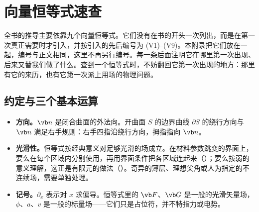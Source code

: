 \providecommand{\idwhere}[2]{\par\vspace{1pt}{\small{\sffamily\bfseries\color{muted}\ZE{首次出现}{First used}}\enspace #1\par
  {\sffamily\bfseries\color{muted}\ZE{后面用在}{Used again}}\enspace #2\par}\vspace{2pt}}

\chapter{向量恒等式速查}\label{app:identities}

全书的推导主要依靠九个向量恒等式。它们没有在书的开头一次列出，而是在第一次真正需要时才引入，并按引入的先后编号为 (V1)--(V9)。本附录把它们放在一起，编号与正文相同，这里不再另行编号。每一条后面注明它在哪里第一次出现、后来又替我们做了什么。查到一个恒等式时，不妨翻回它第一次出现的地方：那里有它的来历，也有它第一次派上用场的物理问题。

\section{约定与三个基本运算}\label{sec:app-conventions}

\begin{itemize}
\item \textbf{方向。}$\vb n$ 是闭合曲面的外法向。开曲面 $S$ 的边界曲线 $\partial S$ 的绕行方向与 $\vb n$ 满足右手规则：右手四指沿绕行方向，拇指指向 $\vb n$。
\item \textbf{光滑性。}恒等式按经典意义对足够光滑的场成立。在材料参数跳变的界面上，要么在每个区域内分别使用，再用界面条件把各区域连起来（）；要么按弱的意义理解，这正是有限元的做法（）。奇异的薄层、理想尖角或人为指定的不连续场，需要单独处理。
\item \textbf{记号。}$\partial_x$ 表示对 $x$ 求偏导。恒等式里的 $\vb F$、$\vb G$ 是一般的光滑矢量场，$\phi$、$a$、$v$ 是一般的标量场——它们只是占位符，并不特指力或电势。
\end{itemize}

